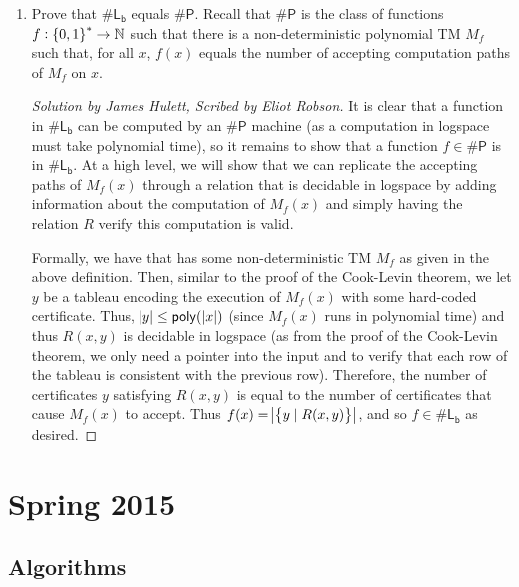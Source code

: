 \documentclass{article}
\newenvironment{scribed}[2]{\begin{proof}[Solution by #1, Scribed by #2]}{\end{proof}}
\newcommand{\Sharp}[1]{\mathsf{\# #1}}
\newcommand{\sharpP}{\mathsf{\#P}}
\newcommand{\poly}{\mathsf{poly}}
\newcommand{\Naturals}{\mathbb{N}}
\begin{document}
\begin{enumerate}
	\item Prove that \(\Sharp{L_b}\) equals \(\sharpP\). Recall that \(\sharpP\) is the class of functions \(f : \set{0,1}^* \to \Naturals\) such that there is a non-deterministic polynomial TM \(M_f\) such that, for all \(x\), \(f(x)\) equals the number of accepting computation paths of \(M_f\) on \(x\).
    
    \begin{scribed}{James Hulett}{Eliot Robson}
        It is clear that a function in \(\Sharp{L_b}\) can be computed by an \(\sharpP\) machine (as a computation in logspace must take polynomial time), so it remains to show that a function \(f \in \sharpP\) is in \(\Sharp{L_b}\). At a high level, we will show that we can replicate the accepting paths of \(M_f(x)\) through a relation that is decidable in logspace by adding information about the computation of \(M_f(x)\) and simply having the relation \(R\) verify this computation is valid.
        
        Formally, we have that has some non-deterministic TM \(M_f\) as given in the above definition. Then, similar to the proof of the Cook-Levin theorem, we let \(y\) be a tableau encoding the execution of \(M_f(x)\) with some hard-coded certificate. Thus, \(\abs{y} \leq \poly(\abs[0]{x})\) (since \(M_f(x)\) runs in polynomial time) and thus \(R(x,y)\) is decidable in logspace (as from the proof of the Cook-Levin theorem, we only need a pointer into the input and to verify that each row of the tableau is consistent with the previous row). Therefore, the number of certificates \(y\) satisfying \(R(x,y)\) is equal to the number of certificates that cause \(M_f(x)\) to accept. Thus \(f(x) = \abs[1]{\set{y \mid R(x,y)}}\), and so \(f \in \Sharp{L_b}\) as desired.
    \end{scribed}
\end{enumerate}

\section{Spring 2015}

\subsection{Algorithms}
\end{document}
